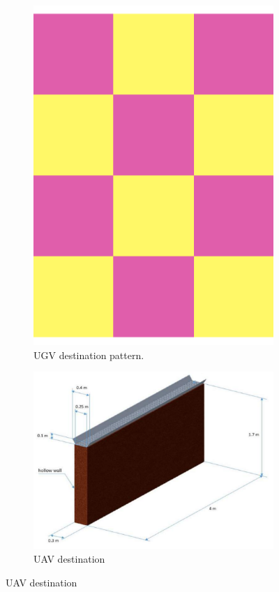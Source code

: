 \begin{figure}[H]
\centering
\begin{subfigure}{.3\textwidth}
  \centering
\vspace{18mm}
\includegraphics[scale=0.1]{fig/pattern.pdf}
\vspace{18mm}
\caption[UGV destination]{UGV destination pattern.}
\label{fig:checker}
\end{subfigure}
\begin{subfigure}{.65\textwidth}
  \centering
\includegraphics[scale=0.35]{fig/wall_sample.png}
\caption[UAV destination]{UAV destination}
\label{fig:uavdest}
\end{subfigure}


\end{figure}
